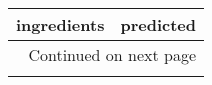 \begin{longtable}{p{7cm}p{7cm}}
\toprule
                                                                                                                                                                                                                                                                                            ingredients &                                                                                                                                                                                                                                                                                                  predicted \\
\midrule
\endhead
\midrule
\multicolumn{2}{r}{{Continued on next page}} \\
\midrule
\endfoot


\end{longtable}
